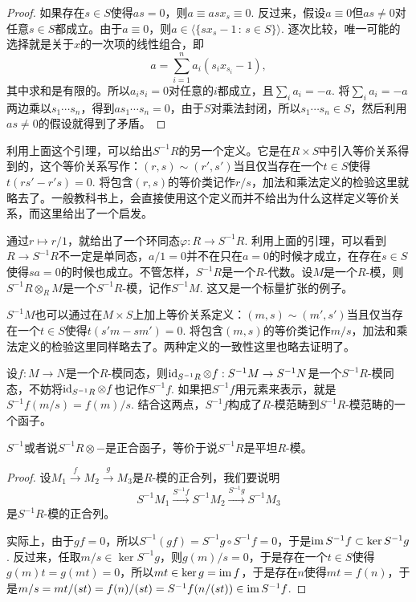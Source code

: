 \begin{proof} 
	如果存在$s \in S$使得$as=0$，则$a\equiv asx_s\equiv 0$. 反过来，假设$a\equiv 0$但$as\neq 0$对任意$s\in S$都成立。由于$a\equiv 0$，则$a\in \bigl\langle\{sx_s-1\,:\, s\in S\}\bigr\rangle$. 逐次比较，唯一可能的选择就是关于$x$的一次项的线性组合，即
	\[
	a=\sum_{i=1}^n a_i(s_ix_{s_i}-1),
	\]
	其中求和是有限的。所以$a_is_i=0$对任意的$i$都成立，且$\sum_i a_i=-a$. 将$\sum_i a_i=-a$两边乘以$s_1\cdots s_n$，得到$as_1\cdots s_n=0$，由于$S$对乘法封闭，所以$s_1\cdots s_n\in S$，然后利用$as\neq 0$的假设就得到了矛盾。
\end{proof}

\para 利用上面这个引理，可以给出$S^{-1}R$的另一个定义。它是在$R\times S$中引入等价关系得到的，这个等价关系写作：$(r,s)\sim (r',s')$当且仅当存在一个$t\in S$使得$t(rs'-r's)=0$. 将包含$(r,s)$的等价类记作$r/s$，加法和乘法定义的检验这里就略去了。一般教科书上，会直接使用这个定义而并不给出为什么这样定义等价关系，而这里给出了一个启发。

通过$r\mapsto r/1$，就给出了一个环同态$\varphi:R\to S^{-1}R$. 利用上面的引理，可以看到$R\to S^{-1}R$不一定是单同态，$a/1=0$并不在只在$a=0$的时候才成立，在存在$s\in S$使得$sa=0$的时候也成立。不管怎样，$S^{-1}R$是一个$R$-代数。设$M$是一个$R$-模，则$S^{-1}R\otimes_R M$是一个$S^{-1}R$-模，记作$S^{-1}M$. 这又是一个标量扩张的例子。

$S^{-1}M$也可以通过在$M\times S$上加上等价关系定义：$(m,s)\sim (m',s')$当且仅当存在一个$t\in S$使得$t(s'm-sm')=0$. 将包含$(m,s)$的等价类记作$m/s$，加法和乘法定义的检验这里同样略去了。两种定义的一致性这里也略去证明了。

\para 设$f:M\to N$是一个$R$-模同态，则$\operatorname{id}_{S^{-1}R}\otimes f:S^{-1}M\to S^{-1}N$是一个$S^{-1}R$-模同态，不妨将$\operatorname{id}_{S^{-1}R}\otimes f$也记作$S^{-1}f$. 如果把$S^{-1}f$用元素来表示，就是$S^{-1}f(m/s)=f(m)/s$. 结合这两点，$S^{-1}f$构成了$R$-模范畴到$S^{-1}R$-模范畴的一个函子。

\begin{pro}
	\label{flat_loc}
	$S^{-1}$或者说$S^{-1}R\otimes -$是正合函子，等价于说$S^{-1}R$是平坦$R$-模。
\end{pro}

\begin{proof}
设$M_1\xrightarrow{f} M_2\xrightarrow{g} M_3$是$R$-模的正合列，我们要说明
\[
	S^{-1}M_1\xrightarrow{S^{-1}f} S^{-1}M_2\xrightarrow{S^{-1}g} S^{-1}M_3
\]
是$S^{-1}R$-模的正合列。

实际上，由于$gf=0$，所以$S^{-1}(gf)=S^{-1}g\circ S^{-1}f=0$，于是$\operatorname{im} S^{-1}f\subset \ker S^{-1}g$. 反过来，任取$m/s\in \ker S^{-1}g$，则$g(m)/s=0$，于是存在一个$t\in S$使得$g(m)t=g(mt)=0$，所以$mt\in \ker g=\operatorname{im} f$，于是存在$n$使得$mt=f(n)$，于是$m/s=mt/(st)=f(n)/(st)=S^{-1}f(n/(st))\in \operatorname{im} S^{-1}f$.
\end{proof}

